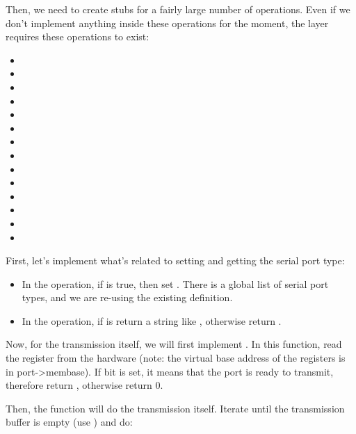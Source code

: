 Then, we need to create stubs for a fairly large number of
operations. Even if we don't implement anything inside these
operations for the moment, the  layer requires these
operations to exist:

\begin{itemize}
\item {}
\item {}
\item {}
\item {}
\item {}
\item {}
\item {}
\item {}
\item {}
\item {}
\item {}
\item {}
\item {}
\item {}
\end{itemize}

First, let's implement what's related to setting and getting the
serial port type:

\begin{itemize}

\item In the  operation, if 
  is true, then set . There is a global
  list of serial port types, and we are re-using the existing
  definition.

\item In the  operation, if  is  return a
  string like , otherwise return .

\end{itemize}

Now, for the transmission itself, we will first implement
. In this function, read the register  from
the hardware (note: the virtual base address of the registers is in
port->membase). If bit  is set, it means that the
port is ready to transmit, therefore return , otherwise
return 0.

Then, the  function will do the transmission
itself. Iterate until the transmission buffer is empty (use
) and do:

